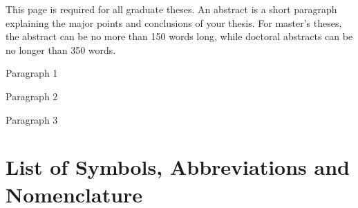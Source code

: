 \documentclass[12pt]{ucalgthes1}
\begin{document}
This page is required for all graduate theses.  An abstract is a short paragraph explaining the major points and conclusions of your thesis.  For master's theses, the abstract can be no more than 150 words long, while doctoral abstracts can be no longer than 350 words.

\newpage
{}
{}
Paragraph 1

Paragraph 2

Paragraph 3

\begin{singlespace}
\newpage
{}
\tableofcontents
\pagestyle{plain}
\newpage
{}
\listoftables
\pagestyle{plain}
\newpage
{}
\listoffigures
\pagestyle{plain}
\clearpage
\clearpage          %
\end{singlespace}
\newpage
{}
\chapter*{\bf{List of Symbols, Abbreviations and Nomenclature}\hfill} 
\listofsymbols
\pagestyle{plain}
\clearpage



%
%
%
%
\appendix

\end{document}
